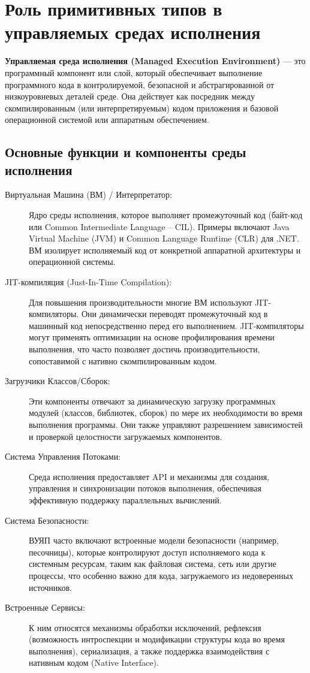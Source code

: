 \section{Роль примитивных типов в управляемых средах исполнения}

\textbf{ Управляемая среда исполнения (Managed Execution Environment)} — это программный компонент или слой, который обеспечивает выполнение программного кода в контролируемой,
безопасной и абстрагированной от низкоуровневых деталей среде. Она действует как посредник между скомпилированным (или интерпретируемым) кодом приложения и базовой операционной
системой или аппаратным обеспечением.

\subsection{Основные функции и компоненты среды исполнения}

\begin{description}

    \item[Виртуальная Машина (ВМ) / Интерпретатор:]
    Ядро среды исполнения, которое выполняет промежуточный код (байт-код или Common Intermediate Language – CIL). Примеры включают Java Virtual Machine (JVM) и Common Language Runtime (CLR) для .NET. ВМ изолирует исполняемый код от конкретной аппаратной архитектуры и операционной системы.
    \item[JIT-компиляция (Just-In-Time Compilation):]
    Для повышения производительности многие ВМ используют JIT-компиляторы. Они динамически переводят промежуточный код в машинный код непосредственно перед его выполнением. JIT-компиляторы могут применять оптимизации на основе профилирования времени выполнения, что часто позволяет достичь производительности, сопоставимой с нативно скомпилированным кодом.
    \item[Загрузчики Классов/Сборок:]
    Эти компоненты отвечают за динамическую загрузку программных модулей (классов, библиотек, сборок) по мере их необходимости во время выполнения программы. Они также управляют разрешением зависимостей и проверкой целостности загружаемых компонентов.
    \item[Система Управления Потоками:]
    Среда исполнения предоставляет API и механизмы для создания, управления и синхронизации потоков выполнения, обеспечивая эффективную поддержку параллельных вычислений.
    \item[Система Безопасности:]
    ВУЯП часто включают встроенные модели безопасности (например, песочницы), которые контролируют доступ исполняемого кода к системным ресурсам, таким как файловая система, сеть или другие процессы, что особенно важно для кода, загружаемого из недоверенных источников.
    \item[Встроенные Сервисы:]
    К ним относятся механизмы обработки исключений, рефлексия (возможность интроспекции и модификации структуры кода во время выполнения), сериализация, а также поддержка взаимодействия с нативным кодом (Native Interface).
\end{description}

